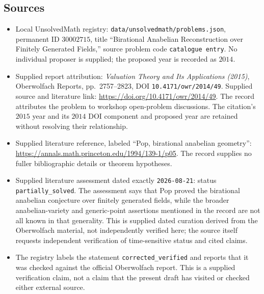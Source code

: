 \documentclass[11pt]{article}
\begin{document}
\subsection{Sources}
\begin{itemize}
\item Local UnsolvedMath registry: \texttt{data/unsolvedmath/problems.json}, permanent ID \(30002715\), title ``Birational Anabelian Reconstruction over Finitely Generated Fields,'' source problem code \texttt{catalogue entry}. No individual proposer is supplied; the proposed year is recorded as \(2014\).
\item Supplied report attribution: \emph{Valuation Theory and Its Applications (2015)}, Oberwolfach Reports, pp.~2757--2823, DOI \texttt{10.4171/owr/2014/49}. Supplied source and literature link: \url{https://doi.org/10.4171/owr/2014/49}. The record attributes the problem to workshop open-problem discussions. The citation's \(2015\) year and its \(2014\) DOI component and proposed year are retained without resolving their relationship.
\item Supplied literature reference, labeled ``Pop, birational anabelian geometry'': \url{https://annals.math.princeton.edu/1994/139-1/p05}. The record supplies no fuller bibliographic details or theorem hypotheses.
\item Supplied literature assessment dated exactly \texttt{2026-08-21}: status \texttt{partially\_solved}. The assessment says that Pop proved the birational anabelian conjecture over finitely generated fields, while the broader anabelian-variety and generic-point assertions mentioned in the record are not all known in that generality. This is supplied dated curation derived from the Oberwolfach material, not independently verified here; the source itself requests independent verification of time-sensitive status and cited claims.
\item The registry labels the statement \texttt{corrected\_verified} and reports that it was checked against the official Oberwolfach report. This is a supplied verification claim, not a claim that the present draft has visited or checked either external source.
\end{itemize}
\end{document}
